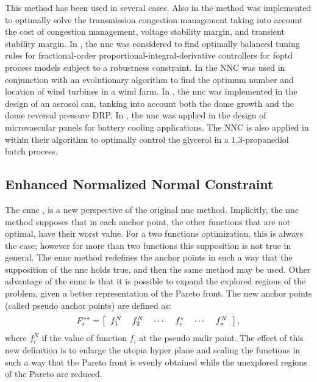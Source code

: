 This method has been used in several cases. Also in \citet{Hosseini2016a} the method was implemented to optimally solve the transmission congestion management taking into account the cost of congestion management, voltage stability margin, and transient stability margin. In \citet{Sanchez2017a}, the \gls{nnc} was considered to find optimally balanced tuning rules for fractional-order proportional-integral-derivative controllers for \gls{foptd} process models subject to a robustness constraint. In \citet{Mittal2017a} the NNC was used in conjunction with an evolutionary algorithm to find the optimum number and location of wind turbines in a wind farm. In \citet{Benki2018}, the \gls{nnc} was implemented in the design of an aerosol can, tanking into account both the dome growth and the dome reversal pressure DRP. In \citet{Tan2018a}, the \gls{nnc} was applied in the design of microvascular panels for battery cooling applications. The NNC is also applied in \citet{Liu2019} within their algorithm to optimally control the glycerol in a 1,3-propanediol batch process.

\subsection{Enhanced Normalized Normal Constraint}
\label{sec:ENNC}
The \gls{ennc} \citet{Sanchis2008}, is a new perspective of the original \gls{nnc} method. Implicitly, the \gls{nnc} method supposes that in each anchor point, the other functions that are not optimal, have their worst value. For a two functions optimization, this is always the case; however for more than two functions this supposition is not true in general. The \gls{ennc} method redefines the anchor points in such a way that the supposition of the \gls{nnc} holds true, and then the same method may be used. Other advantage of the \gls{ennc} is that it is possible to expand the explored regions of the problem, given a better representation of the Pareto front.
%
The new anchor points (called pseudo anchor points) are defined as:
\begin{equation}
F_i^{**} = \left[
\begin{tabular}{cccccc}
$f_1^N$ & $f_2^N$ & $\cdots$ & $f_i^{*}$ & $\cdots$ & $f_n^N$
\end{tabular}
\right],
\label{eq:PseudoAnchor}
\end{equation}
%
where $f_i^N$ if the value of function $f_i$ at the pseudo nadir point. The effect of this new definition is to enlarge the utopia hyper plane and scaling the functions in such a way that the Pareto front is evenly obtained while the unexplored regions of the Pareto are reduced.

